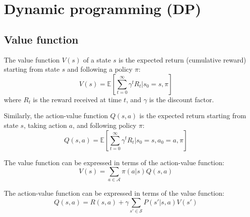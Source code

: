 \section{Dynamic programming (DP)}

\subsection{Value function}

The value function \( V(s) \) of a state \( s \) is the expected return (cumulative reward) starting from state \( s \) and following a policy \( \pi \):
\begin{equation}
    V(s) = \mathbb{E} \left[ \sum_{t=0}^{\infty} \gamma^t R_t | s_0 = s, \pi \right]
\end{equation}
where \( R_t \) is the reward received at time \( t \), and \( \gamma \) is the discount factor.

Similarly, the action-value function \( Q(s, a) \) is the expected return starting from state \( s \), taking action \( a \), and following policy \( \pi \):
\begin{equation}
    Q(s, a) = \mathbb{E} \left[ \sum_{t=0}^{\infty} \gamma^t R_t | s_0 = s, a_0 = a, \pi \right]
\end{equation}

The value function can be expressed in terms of the action-value function:
\begin{equation}
    V(s) = \sum_{a \in \mathcal{A}} \pi(a | s) Q(s, a)
\end{equation}

The action-value function can be expressed in terms of the value function:
\begin{equation}
    Q(s, a) = R(s, a) + \gamma \sum_{s' \in \mathcal{S}} P(s' | s, a) V(s')
\end{equation}
